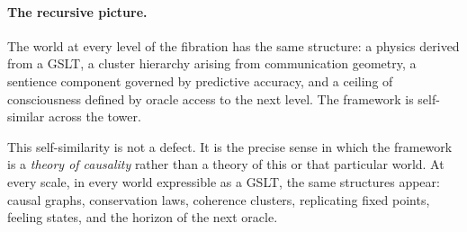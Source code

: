 \paragraph{The recursive picture.}
The world at every level of the fibration has the same structure:
a physics derived from a GSLT, a cluster hierarchy arising from
communication geometry, a sentience component governed by
predictive accuracy, and a ceiling of consciousness defined by
oracle access to the next level.
The framework is self-similar across the tower.

This self-similarity is not a defect.
It is the precise sense in which the framework is a \emph{theory
of causality} rather than a theory of this or that particular
world.
At every scale, in every world expressible as a GSLT, the same
structures appear: causal graphs, conservation laws, coherence
clusters, replicating fixed points, feeling states, and the
horizon of the next oracle.
